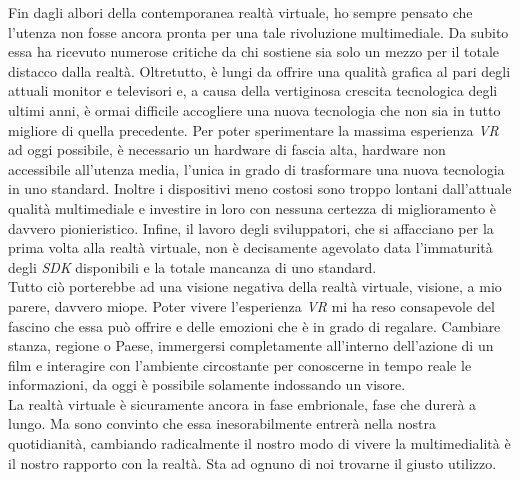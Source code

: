 Fin dagli albori della contemporanea realtà virtuale, ho sempre pensato che l'utenza non fosse ancora pronta per una tale rivoluzione multimediale. Da subito essa ha ricevuto numerose critiche da chi sostiene sia solo un mezzo per il totale distacco dalla realtà. Oltretutto, è lungi da offrire una qualità grafica al pari degli attuali monitor e televisori e, a causa della vertiginosa crescita tecnologica degli ultimi anni, è ormai difficile accogliere una nuova tecnologia che non sia in tutto migliore di quella precedente. Per poter sperimentare la massima esperienza \textit{VR} ad oggi possibile, è necessario un hardware di fascia alta, hardware non accessibile all'utenza media, l'unica in grado di trasformare una nuova tecnologia in uno standard. Inoltre i dispositivi meno costosi sono troppo lontani dall'attuale qualità multimediale e investire in loro con nessuna certezza di miglioramento è davvero pionieristico. Infine, il lavoro degli sviluppatori, che si affacciano per la prima volta alla realtà virtuale, non è decisamente agevolato data l'immaturità degli \textit{SDK} disponibili e la totale mancanza di uno standard. \\ 
Tutto ciò porterebbe ad una visione negativa della realtà virtuale, visione, a mio parere, davvero miope. Poter vivere l'esperienza \textit{VR} mi ha reso consapevole del fascino che essa può offrire e delle emozioni che è in grado di regalare. Cambiare stanza, regione o Paese, immergersi completamente all'interno dell'azione di un film e interagire con l'ambiente circostante per conoscerne in tempo reale le informazioni, da oggi è possibile solamente indossando un visore. \\
La realtà virtuale è sicuramente ancora in fase embrionale, fase che durerà a lungo. Ma sono convinto che essa inesorabilmente entrerà nella nostra quotidianità, cambiando radicalmente il nostro modo di vivere la multimedialità è il nostro rapporto con la realtà. Sta ad ognuno di noi trovarne il giusto utilizzo.  